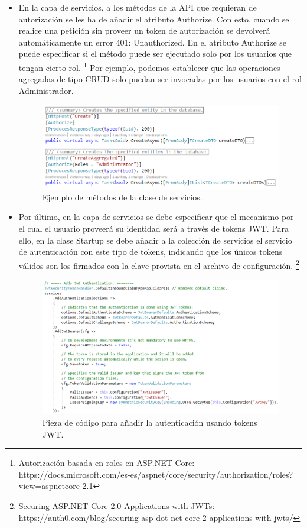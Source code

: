 \documentclass[11pt,spanish,listoffigures]{tfgetsinf}
\begin{document}
\begin{itemize}
\item En la capa de servicios, a los métodos de la API que requieran de autorización se les ha de añadir el atributo Authorize. Con esto, cuando se realice una petición sin proveer un token de autorización se devolverá automáticamente un error 401: Unauthorized. En el atributo Authorize se puede especificar si el método puede ser ejecutado solo por los usuarios que tengan cierto rol. \footnote{ Autorización basada en roles en ASP.NET Core: https://docs.microsoft.com/es-es/aspnet/core/security/authorization/roles?view=aspnetcore-2.1} Por ejemplo, podemos establecer que las operaciones agregadas de tipo CRUD solo puedan ser invocadas por los usuarios con el rol Administrador.

\begin{figure}[h]
\centering
\includegraphics[scale=0.7]{Authorize}
\caption{Ejemplo de métodos de la clase de servicios.}
\end{figure}

\item Por último, en la capa de servicios se debe especificar que el mecanismo por el cual el usuario proveerá su identidad será a través de tokens JWT. Para ello, en la clase Startup se debe añadir a la colección de servicios el servicio de autenticación con este tipo de tokens, indicando que los únicos tokens válidos son los firmados con la clave provista en el archivo de configuración. \footnote{ Securing ASP.NET Core 2.0 Applications with JWTs: https://auth0.com/blog/securing-asp-dot-net-core-2-applications-with-jwts/}

\begin{figure}[h]
\centering
\includegraphics[scale=0.7]{jwt}
\caption{Pieza de código para añadir la autenticación usando tokens JWT.}
\end{figure}

\end{itemize}
\end{document}
